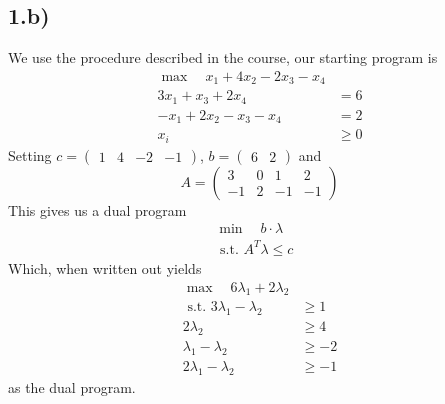 \documentclass[11pt, a4paper]{article}
\begin{document}
\subsection*{1.b)}
We use the procedure described in the course, our starting program is
\begin{align*}
	\max \quad x_1 + 4x_2 - 2 x_3 - x_4&\\
	3x_1 + x_3 + 2x_4 &=6\\
	-x_1 + 2x_2 - x_3 - x_4 &= 2\\
	x_i &\geq 0
\end{align*}
Setting $c= \begin{pmatrix}
	1 & 4 & -2 & -1
\end{pmatrix} $, $ b= \begin{pmatrix}
 6 &2
\end{pmatrix} $ and
\[ 
A = 
\begin{pmatrix}
	3 & 0 & 1 & 2 \\
	-1 & 2 & -1  & -1
\end{pmatrix} 
\]
This gives us a dual program
\begin{align*}
	\min \quad b\cdot \lambda &\\
	\text{ s.t. } A^{T}\lambda \leq c
\end{align*}
Which, when written out yields
\begin{align*}
	\max\quad 6\lambda_1 + 2 \lambda_2&\\
	\text{ s.t. } 3\lambda_1 - \lambda_2 & \geq 1\\
	2\lambda_2 &\geq 4\\
	\lambda_1 - \lambda_2 &\geq -2\\
	2\lambda_1 - \lambda_2 &\geq  -1
\end{align*}
as the dual program.
\end{document}
